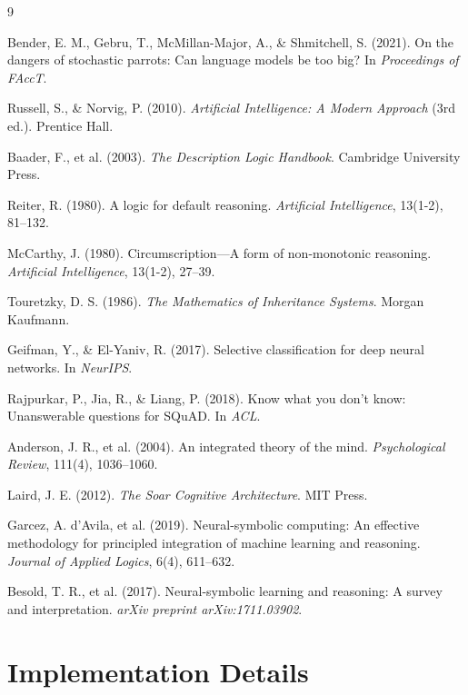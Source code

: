 \documentclass[11pt]{article}
\begin{document}

\begin{thebibliography}{9}

Bender, E. M., Gebru, T., McMillan-Major, A., \& Shmitchell, S. (2021). On the dangers of stochastic parrots: Can language models be too big? In \emph{Proceedings of FAccT}.

Russell, S., \& Norvig, P. (2010). \emph{Artificial Intelligence: A Modern Approach} (3rd ed.). Prentice Hall.

Baader, F., et al. (2003). \emph{The Description Logic Handbook}. Cambridge University Press.

Reiter, R. (1980). A logic for default reasoning. \emph{Artificial Intelligence}, 13(1-2), 81–132.

McCarthy, J. (1980). Circumscription—A form of non-monotonic reasoning. \emph{Artificial Intelligence}, 13(1-2), 27–39.

Touretzky, D. S. (1986). \emph{The Mathematics of Inheritance Systems}. Morgan Kaufmann.

Geifman, Y., \& El-Yaniv, R. (2017). Selective classification for deep neural networks. In \emph{NeurIPS}.

Rajpurkar, P., Jia, R., \& Liang, P. (2018). Know what you don't know: Unanswerable questions for SQuAD. In \emph{ACL}.

Anderson, J. R., et al. (2004). An integrated theory of the mind. \emph{Psychological Review}, 111(4), 1036–1060.

Laird, J. E. (2012). \emph{The Soar Cognitive Architecture}. MIT Press.

Garcez, A. d'Avila, et al. (2019). Neural-symbolic computing: An effective methodology for principled integration of machine learning and reasoning. \emph{Journal of Applied Logics}, 6(4), 611–632.

Besold, T. R., et al. (2017). Neural-symbolic learning and reasoning: A survey and interpretation. \emph{arXiv preprint arXiv:1711.03902}.

\end{thebibliography}

\appendix

\section{Implementation Details}
\end{document}
